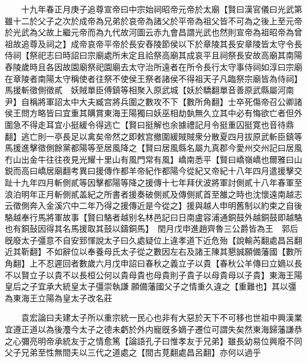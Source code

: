 　　十九年春正月庚子追尊宣帝曰中宗始祠昭帝元帝於太廟【賢曰漢官儀曰光武第雖十二於父子之次於成帝為兄弟於哀帝為諸父於平帝為祖父皆不可為之後上至元帝於光武為父故上繼元帝而為九代故河圖云赤九會昌謂光武也然則宣帝為祖昭帝為曾祖故追尊及祠之】成帝哀帝平帝於長安舂陵節侯以下於章陵其長安章陵皆太守令長侍祠【祭祀志曰時詔曰宗廟處所未定且祫祭高廟其成哀平且祠祭長安故高廟其南陽舂陵歲時且各因故園廟祭祀園廟去太守治所遠者在所令長行太守事侍祠如淳曰宗廟在章陵者南陽太守稱使者往祭不使侯王祭者諸侯不得祖天子凡臨祭宗廟皆為侍祠】　馬援斬徵側徵貳　妖賊單臣傅鎮等相聚入原武城【妖於驕翻單音善原武縣屬河南尹】自稱將軍詔太中大夫臧宫將兵圍之數攻不下【數所角翻】士卒死傷帝召公卿諸侯王問方略皆曰宜重其購賞東海王陽獨曰妖巫相劫埶無久立其中必有悔欲亡者但外圍急不得走耳宜小挺緩令得逃亡【賢曰挺解也余據禮記月令挺重囚挺寛也音待鼎翻】逃亡則一亭長足以禽矣帝然之即敕宫撤圍緩賊賊衆分散夏四月拔原武斬臣鎮等　馬援進擊徵側餘黨都陽等至居風降之【賢曰居風縣名屬九真郡今愛州交州記曰居風冇山出金牛往往夜見光耀十里山有風門常有風】嶠南悉平【賢曰嶠嶺嶠也爾雅曰山鋭而高曰嶠居廟翻考異曰援傳作都羊帝紀作都陽今從紀又帝紀十八年四月遣援擊交趾十九年四月斬側貳等因擊都陽等降之援傳十七年拜伏波將軍討側貳十八年春軍至浪泊明年正月斬側貳盖紀之所書者援奏破側貳及傳側貳首至雒之時也沈懷遠南越志云徵側奔入金溪穴中二年乃得之援傳近是今從之】援與越人申明舊制以約束之自後駱越奉行馬將軍故事【賢曰駱者越别名林邑記曰日南盧容浦通銅鼓外越銅鼓即越駱也有銅鼔因得其名馬援取其鼓以鑄銅馬】　閏月戊申進趙齊魯三公爵皆為王　郭后旣廢太子彊意不自安郅惲說太子曰久處疑位上違孝道下近危殆【說輸芮翻處昌呂翻近其靳翻】不如辭位以奉養母氏太子從之數因左右及諸王陳其懇誠願備藩國【數所角翻】上不忍遲回者數歲六月戊申詔曰春秋之義立子以貴【春秋公羊傳曰立嫡以長不以賢立子以貴不以長桓公何以貴母貴也母貴則子貴子以母貴母以子貴】東海王陽皇后之子宜承大統皇太子彊崇執謙願備藩國父子之情重久違之【重難也】其以彊為東海王立陽為皇太子改名莊

　　袁宏論曰夫建太子所以重宗統一民心也非有大惡於天下不可移也世祖中興漢業宜遵正道以為後灋今太子之德未虧於外内寵旣多嫡子遷位可謂失矣然東海歸藩謙恭之心彌亮明帝承統友于之情愈篤【論語孔子曰惟孝友于兄弟】雖長幼易位興廢不同父子兄弟至性無間夫以三代之道處之【間古莧翻處昌呂翻】亦何以過乎

